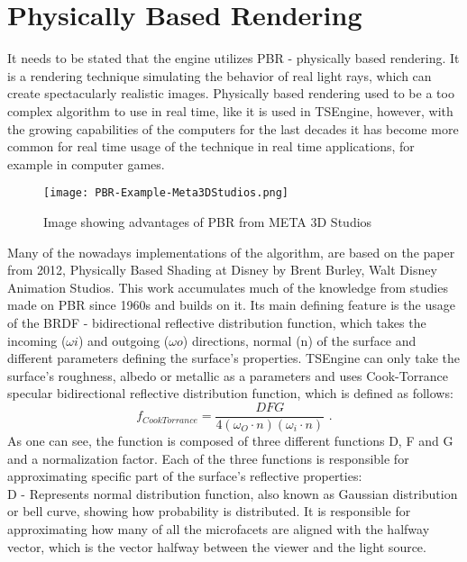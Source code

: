 \newpage
\section{Physically Based Rendering}
\label{sec:pbr}
\hspace{\parindent}
It needs to be stated that the engine utilizes PBR - physically based rendering. It is a rendering technique simulating the behavior of real light rays, which can create spectacularly realistic images. Physically based rendering used to be a too complex algorithm to use in real time, like it is used in TSEngine, however, with the growing capabilities of the computers for the last decades it has become more common for real time usage of the technique in real time applications, for example in computer games.
\begin{figure}[H]
    \texttt{[image: PBR-Example-Meta3DStudios.png]}
    \caption{Image showing advantages of PBR from META 3D Studios \cite{pbrExample} }
\end{figure}
Many of the nowadays implementations of the algorithm, are based on the paper from 2012, Physically Based Shading at Disney by Brent Burley, Walt Disney Animation Studios. This work accumulates much of the knowledge from studies made on PBR since 1960s and builds on it. Its main defining feature is the usage of the BRDF - bidirectional reflective distribution function, which takes the incoming ($\omega i$) and outgoing ($\omega o$) directions, normal (n) of the surface and different parameters defining the surface's properties. TSEngine can only take the surface's roughness, albedo or metallic as a parameters and uses Cook-Torrance specular bidirectional reflective distribution function, which is defined as follows:
\begin{equation}
f_{CookTorrance}=\frac{DFG}{4(\omega_{O} \cdot n)(\omega_{i} \cdot n)}
\text{ .}
\label{EquationCookTorrance}
\end{equation}
As one can see, the function is composed of three different functions D, F and G and a normalization factor. Each of the three functions is responsible for approximating specific part of the surface's reflective properties:\\
D - Represents normal distribution function, also known as Gaussian distribution or bell curve, showing how probability is distributed. It is responsible for approximating how many of all the microfacets are aligned with the halfway vector, which is the vector halfway between the viewer and the light source. \\

